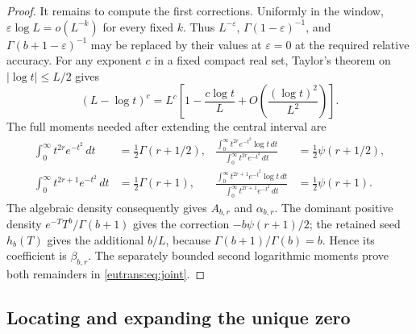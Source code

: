 \begin{proof}
It remains to compute the first corrections. Uniformly in the window,
$\varepsilon\log L=o(L^{-k})$ for every fixed $k$.
Thus $L^{-\varepsilon}$, $\Gamma(1-\varepsilon)^{-1}$, and
$\Gamma(b+1-\varepsilon)^{-1}$ may be replaced by their values at
$\varepsilon=0$ at the required relative accuracy. For any exponent
$c$ in a fixed compact real set, Taylor's theorem on
$|\log t|\leq L/2$ gives
\[
 (L-\log t)^c=L^c\left[
         1-\frac{c\log t}{L}
          +O\left(\frac{(\log t)^2}{L^2}\right)\right].
\]
The full moments needed after extending the central interval are
\begin{align*}
 \int_0^\infty t^{2r}e^{-t^2}\,dt&=\frac12\Gamma(r+1/2),
 &\frac{\int_0^\infty t^{2r}e^{-t^2}\log t\,dt}
       {\int_0^\infty t^{2r}e^{-t^2}\,dt}
       &=\frac12\psi(r+1/2),\\
 \int_0^\infty t^{2r+1}e^{-t^2}\,dt&=\frac12\Gamma(r+1),
 &\frac{\int_0^\infty t^{2r+1}e^{-t^2}\log t\,dt}
       {\int_0^\infty t^{2r+1}e^{-t^2}\,dt}
       &=\frac12\psi(r+1).
\end{align*}
The algebraic density consequently gives $A_{b,r}$ and
$\alpha_{b,r}$. The dominant positive density
$e^{-T}T^b/\Gamma(b+1)$ gives the correction
$-b\psi(r+1)/2$; the retained seed $h_b(T)$ gives the additional
$b/L$, because $\Gamma(b+1)/\Gamma(b)=b$. Hence its coefficient is
$\beta_{b,r}$. The separately bounded second logarithmic moments
prove both remainders in \eqref{eutrans:eq:joint}.
\end{proof}

\subsection{Locating and expanding the unique zero}

